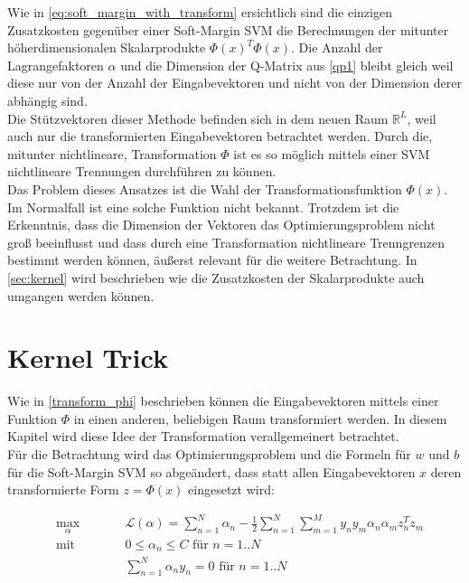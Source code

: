 \documentclass[a4paper,11pt,twoside]{scrreprt}
\newcommand{\Lagr}{\mathcal{L}}
\begin{document}
Wie in \autoref{eq:soft_margin_with_transform} ersichtlich sind die einzigen Zusatzkosten gegenüber einer Soft-Margin \ac{SVM} die Berechnungen der mitunter höherdimensionalen Skalarprodukte $\Phi(x)^{T} \Phi(x)$. Die Anzahl der Lagrangefaktoren $\alpha$ und die Dimension der Q-Matrix aus \autoref{qp1} bleibt gleich weil diese nur von der Anzahl der Eingabevektoren und nicht von der Dimension derer abhängig sind. \\

Die Stützvektoren dieser Methode befinden sich in dem neuen Raum $\mathbb{R}^{L}$, weil auch nur die transformierten Eingabevektoren betrachtet werden. Durch die, mitunter nichtlineare, Transformation $\Phi$ ist es so möglich mittels einer \ac{SVM} nichtlineare Trennungen durchführen zu können. \\

Das Problem dieses Ansatzes ist die Wahl der Transformationsfunktion $\Phi(x)$. Im Normalfall ist eine solche Funktion nicht bekannt. Trotzdem ist die Erkenntnis, dass die Dimension der Vektoren das Optimierungsproblem nicht groß beeinflusst und dass durch eine Transformation nichtlineare Trenngrenzen bestimmt werden können, äußerst relevant für die weitere Betrachtung. In \autoref{sec:kernel} wird beschrieben wie die Zusatzkosten der Skalarprodukte auch umgangen werden können.

\section{Kernel Trick} \label{sec:kernel}

Wie in \autoref{transform_phi} beschrieben können die Eingabevektoren mittels einer Funktion $\Phi$ in einen anderen, beliebigen Raum transformiert werden. In diesem Kapitel wird diese Idee der Transformation verallgemeinert betrachtet. \\

Für die Betrachtung wird das Optimierungsproblem und die Formeln für $w$ und $b$ für die Soft-Margin \ac{SVM} so abgeändert, dass statt allen Eingabevektoren $x$ deren transformierte Form $z = \Phi(x)$ eingesetzt wird:

\begin{subequations} 
	\begin{alignat}{2}
		&\!\max_{\alpha}        &\qquad&  	\Lagr(\alpha) = \sum_{n=1}^{N} \alpha_{n} - \frac{1}{2} \sum_{n=1}^{N} \sum_{m=1}^{M} y_{n} y_{m} \alpha_{n} \alpha_{m} z_{n}^{T} z_{m}\\
		&\text{mit } &      & 0 \leq \alpha_{n} \leq C \text{ für } n=1..N\\
		&       & & \sum_{n=1}^{N} \alpha_{n} y_{n} = 0\text{ für } n=1..N
	\end{alignat}
\end{subequations}
\end{document}
